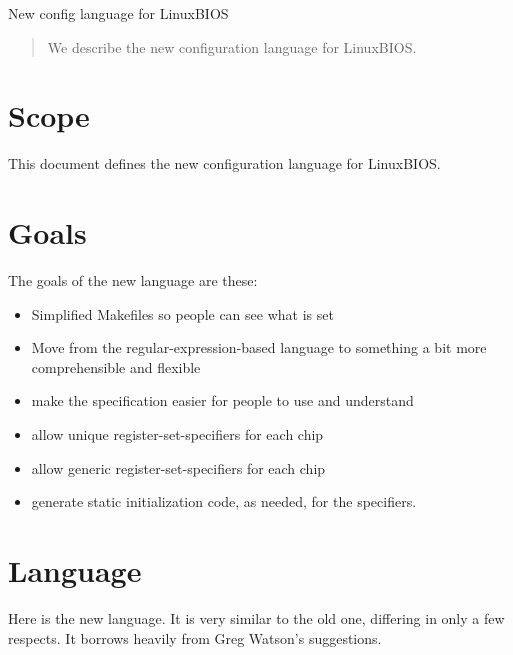 		New config language for LinuxBIOS

\begin{abstract}
We describe the new configuration language for LinuxBIOS.
\end{abstract}

\section{Scope}
This document defines the new configuration language for LinuxBIOS.

\section{Goals}
The goals of the new language are these:
\begin{itemize}
\item Simplified Makefiles so people can see what is set
\item Move from the regular-expression-based language to something
a bit more comprehensible and flexible
\item make the specification easier for people to use and understand
\item allow unique register-set-specifiers for each chip
\item allow generic register-set-specifiers for each chip
\item generate static initialization code, as needed, for the
specifiers.
\end{itemize}

\section{Language}
Here is the new language. It is very similar to the old one, differing
in only a few respects. It borrows heavily from Greg Watson's suggestions.

